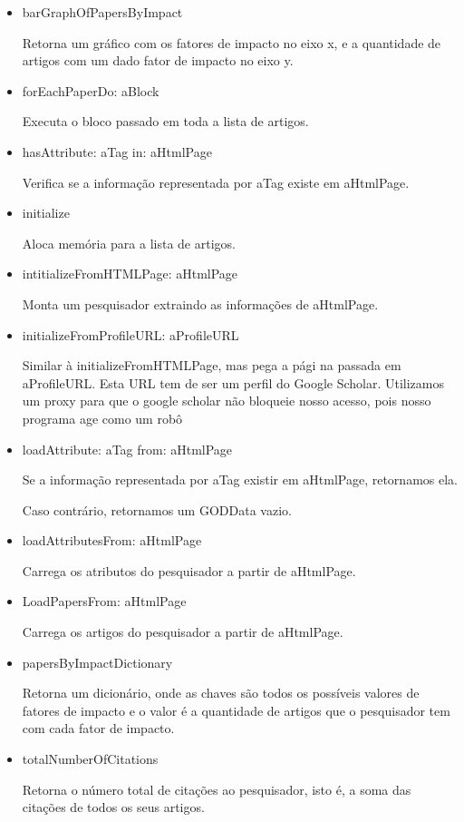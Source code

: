 \begin{itemize}
  \item barGraphOfPapersByImpact

  Retorna um gráfico com os fatores de impacto no eixo x, e a quantidade de artigos com um  dado fator de impacto no eixo y.

  \item forEachPaperDo: aBlock

  Executa o bloco passado em toda a lista de artigos.

  \item hasAttribute: aTag in: aHtmlPage

  Verifica se a informação representada por aTag existe em aHtmlPage.

  \item initialize

  Aloca memória para a lista de artigos.

  \item intitializeFromHTMLPage: aHtmlPage

  Monta um pesquisador extraindo as informações de aHtmlPage.

  \item initializeFromProfileURL: aProfileURL

  Similar à initializeFromHTMLPage, mas pega a pági na passada em aProfileURL. Esta URL   tem de ser um perfil do Google Scholar. Utilizamos um proxy para que o google scholar não   bloqueie nosso acesso, pois nosso programa age como um robô



  \item loadAttribute: aTag from: aHtmlPage

  Se a informação representada por aTag existir em aHtmlPage, retornamos ela.

  Caso contrário, retornamos um GODData vazio.

  \item loadAttributesFrom: aHtmlPage

  Carrega os atributos do pesquisador a partir de aHtmlPage.

  \item LoadPapersFrom: aHtmlPage

  Carrega os artigos do pesquisador a partir de aHtmlPage.


  \item papersByImpactDictionary

  Retorna um dicionário, onde as chaves são todos os possíveis valores de  fatores de impacto   e o valor é a quantidade de artigos que o pesquisador tem com cada fator de impacto.

  \item totalNumberOfCitations

  Retorna o número total de citações ao pesquisador, isto é, a soma das citações de todos os  seus artigos.

\end{itemize}